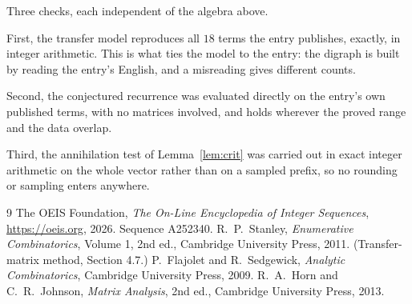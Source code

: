 \documentclass[11pt,a4paper]{article}
\theoremstyle{plain}
\theoremstyle{definition}
\begin{document}
Three checks, each independent of the algebra above.

First, the transfer model reproduces all $18$ terms the entry publishes, exactly, in
integer arithmetic. This is what ties the model to the entry: the digraph is built by reading
the entry's English, and a misreading gives different counts.

Second, the conjectured recurrence was evaluated directly on the entry's own published terms,
with no matrices involved, and holds wherever the proved range and the data overlap.

Third, the annihilation test of Lemma~\ref{lem:crit} was carried out in exact integer
arithmetic on the whole vector rather than on a sampled prefix, so no rounding or sampling
enters anywhere.

\begin{thebibliography}{9}
 The OEIS Foundation, \emph{The On-Line Encyclopedia of Integer
Sequences}, \url{https://oeis.org}, 2026. Sequence A252340.
 R.~P.~Stanley, \emph{Enumerative Combinatorics}, Volume 1, 2nd ed.,
Cambridge University Press, 2011. (Transfer-matrix method, Section 4.7.)
 P.~Flajolet and R.~Sedgewick, \emph{Analytic Combinatorics}, Cambridge
University Press, 2009.
 R.~A.~Horn and C.~R.~Johnson, \emph{Matrix Analysis}, 2nd ed., Cambridge
University Press, 2013.
\end{thebibliography}
\end{document}
